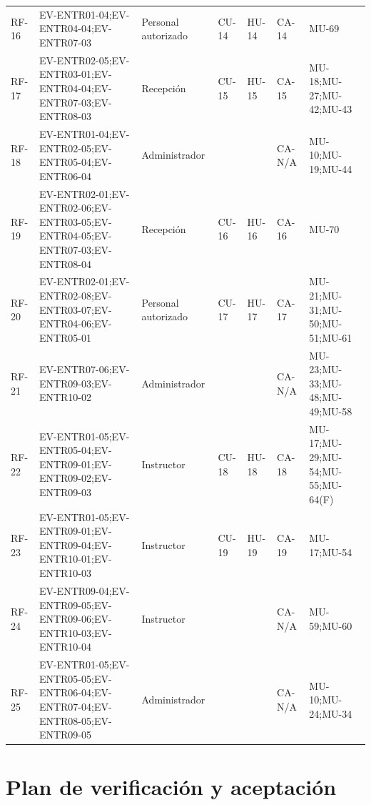 \documentclass[11pt,a4paper,twoside]{article}
\begin{document}
\begin{landscape}
\begin{longtable}{p{2.2cm}p{4.0cm}p{4.0cm}p{2.2cm}p{2.2cm}p{2.2cm}p{3.5cm}}
RF-16 & EV-ENTR01-04;EV-ENTR04-04;EV-ENTR07-03 & Personal autorizado & CU-14 & HU-14 & CA-14 & MU-69 \\
RF-17 & EV-ENTR02-05;EV-ENTR03-01;EV-ENTR04-04;EV-ENTR07-03;EV-ENTR08-03 & Recepción & CU-15 & HU-15 & CA-15 & MU-18;MU-27;MU-42;MU-43 \\
RF-18 & EV-ENTR01-04;EV-ENTR02-05;EV-ENTR05-04;EV-ENTR06-04 & Administrador &  &  & CA-N/A & MU-10;MU-19;MU-44 \\
RF-19 & EV-ENTR02-01;EV-ENTR02-06;EV-ENTR03-05;EV-ENTR04-05;EV-ENTR07-03;EV-ENTR08-04 & Recepción & CU-16 & HU-16 & CA-16 & MU-70 \\
RF-20 & EV-ENTR02-01;EV-ENTR02-08;EV-ENTR03-07;EV-ENTR04-06;EV-ENTR05-01 & Personal autorizado & CU-17 & HU-17 & CA-17 & MU-21;MU-31;MU-50;MU-51;MU-61 \\
RF-21 & EV-ENTR07-06;EV-ENTR09-03;EV-ENTR10-02 & Administrador &  &  & CA-N/A & MU-23;MU-33;MU-48;MU-49;MU-58 \\
RF-22 & EV-ENTR01-05;EV-ENTR05-04;EV-ENTR09-01;EV-ENTR09-02;EV-ENTR09-03 & Instructor & CU-18 & HU-18 & CA-18 & MU-17;MU-29;MU-54;MU-55;MU-64(F) \\
RF-23 & EV-ENTR01-05;EV-ENTR09-01;EV-ENTR09-04;EV-ENTR10-01;EV-ENTR10-03 & Instructor & CU-19 & HU-19 & CA-19 & MU-17;MU-54 \\
RF-24 & EV-ENTR09-04;EV-ENTR09-05;EV-ENTR09-06;EV-ENTR10-03;EV-ENTR10-04 & Instructor &  &  & CA-N/A & MU-59;MU-60 \\
RF-25 & EV-ENTR01-05;EV-ENTR05-05;EV-ENTR06-04;EV-ENTR07-04;EV-ENTR08-05;EV-ENTR09-05 & Administrador &  &  & CA-N/A & MU-10;MU-24;MU-34 \\
\bottomrule\end{longtable}\end{landscape}

\section{Plan de verificación y aceptación}
\end{document}
